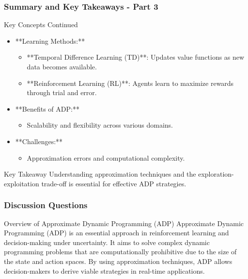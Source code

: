 \documentclass[aspectratio=169]{beamer}
\begin{document}
\begin{frame}[fragile]
    \frametitle{Summary and Key Takeaways - Part 3}
    \begin{block}{Key Concepts Continued}
        \begin{itemize}
            \item **Learning Methods:**
                \begin{itemize}
                    \item **Temporal Difference Learning (TD)**: Updates value functions as new data becomes available.
                    \item **Reinforcement Learning (RL)**: Agents learn to maximize rewards through trial and error.
                \end{itemize}
            \item **Benefits of ADP:**
                \begin{itemize}
                    \item Scalability and flexibility across various domains.
                \end{itemize}
            \item **Challenges:**
                \begin{itemize}
                    \item Approximation errors and computational complexity.
                \end{itemize}
        \end{itemize}
    \end{block}
    
    \begin{block}{Key Takeaway}
        Understanding approximation techniques and the exploration-exploitation trade-off is essential for effective ADP strategies.
    \end{block}
\end{frame}

\begin{frame}[fragile]
    \frametitle{Discussion Questions}
    \begin{block}{Overview of Approximate Dynamic Programming (ADP)}
        Approximate Dynamic Programming (ADP) is an essential approach in reinforcement learning and decision-making under uncertainty. It aims to solve complex dynamic programming problems that are computationally prohibitive due to the size of the state and action spaces. By using approximation techniques, ADP allows decision-makers to derive viable strategies in real-time applications.
    \end{block}
\end{frame}
\end{document}
